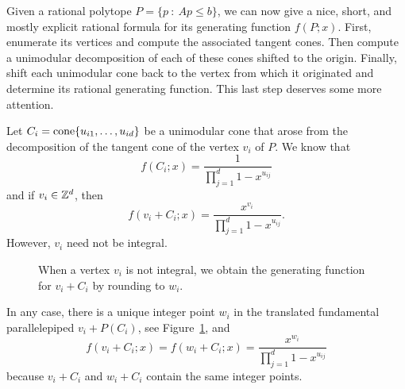Given a rational polytope $P = \{ p ~:~ Ap \leq b \}$,
we can now give a nice, short, and mostly explicit rational formula for its generating function $f(P;x)$.
First, enumerate its vertices and compute the associated tangent cones.
Then compute a unimodular decomposition of each of these cones shifted to the origin.
Finally, shift each unimodular cone back to the vertex from which it originated and determine its rational generating function.
This last step deserves some more attention.

Let $C_i = \operatorname{cone}\{ u_{i1}, \ldots, u_{id} \}$ be a unimodular cone that arose from the decomposition of the tangent cone
of the vertex $v_i$ of $P$.
We know that
\[
  f(C_i;x) = \frac{1}{\prod_{j=1}^d 1 - x^{u_{ij}}}
\]
and if $v_i \in \mathbb{Z}^d$, then
\[
  f(v_i + C_i;x) = \frac{x^{v_i}}{\prod_{j=1}^d 1 - x^{u_{ij}}}.
\]
However, $v_i$ need not be integral.
\begin{figure}
  \begin{center}
  \end{center}
  \caption{When a vertex $v_i$ is not integral, we obtain the generating function for $v_i + C_i$ by rounding to $w_i$.}
  \label{fig:unimodular-cone-apex-shift}
\end{figure}
In any case, there is a unique integer point $w_i$ in the translated fundamental parallelepiped $v_i + P(C_i)$,
see Figure~\ref{fig:unimodular-cone-apex-shift},
and
\[
  f(v_i + C_i;x) = f(w_i + C_i;x) = \frac{x^{w_i}}{\prod_{j=1}^d 1 - x^{u_{ij}}}
\]
because $v_i + C_i$ and $w_i + C_i$ contain the same integer points.

